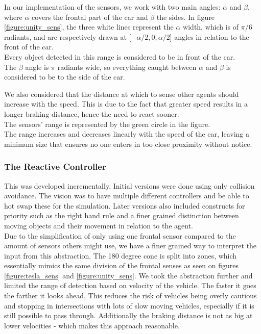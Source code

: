 In our implementation of the sensors, we work with two main angles: $\alpha$ and $\beta$, where $\alpha$  covers the frontal part of the car and $\beta$ the sides.
In figure \ref{figure:unity_sens}, the three white lines represent the $\alpha$ width, which is of $\pi/6$ radiants, and are respectively drawn at [$-\alpha/2, 0, \alpha/2$] angles in relation to the front of the car.\\
Every object detected in this range is considered to be in front of the car.\\

The $\beta$ angle is $\pi$ radiants wide, so everything caught between $\alpha$ and $\beta$ is considered to be to the side of the car.


We also considered that the distance at which to sense other agents should increase with the speed.
This is due to the fact that greater speed results in a longer braking distance, hence the need to react sooner.\\
The sensors' range is represented by the green circle in the figure. \\
The range increases and decreases linearly with the speed of the car, leaving a minimum size that ensures no one enters in too close proximity without notice. 



\subsubsection{The Reactive Controller}
This was developed incrementally. Initial versions were done using only collision avoidance.
The vision was to have multiple different controllers and be able to hot swap these for the simulation.
Later versions also included constructs for priority such as the right hand rule and a finer grained distinction between moving objects and their movement in relation to the agent.\\

Due to the simplification of only using one frontal sensor compared to the amount of sensors others might use, we have a finer grained way to interpret the input from this abstraction.
The 180 degree cone is split into zones, which essentially mimics the same division of the frontal senses as seen on figures \ref{figure:tesla_sens} and \ref{figure:unity_sens}.
We took the abstraction further and limited the range of detection based on velocity of the vehicle. The faster it goes the farther it looks ahead.
This reduces the risk of vehicles being overly cautious and stopping in intersections with lots of slow moving vehicles, especially if it is still possible to pass through.
Additionally the braking distance is not as big at lower velocities - which makes this approach reasonable.\\

